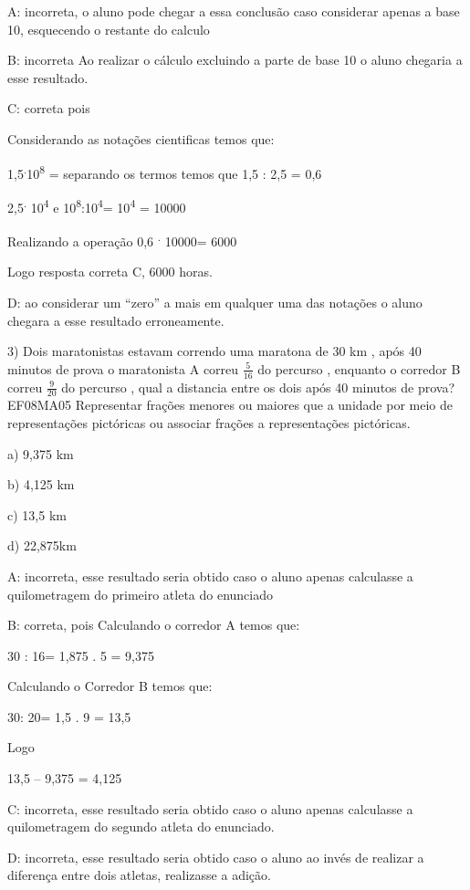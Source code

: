 {A: incorreta, o aluno pode chegar a essa conclusão caso considerar
apenas a base 10, esquecendo o restante do calculo

B: incorreta Ao realizar o cálculo excluindo a parte de base 10 o aluno
chegaria a esse resultado.

C: correta pois

Considerando as notações cientificas temos que:

1,5\textsuperscript{.}10\textsuperscript{8} = separando os termos temos
que 1,5 : 2,5 = 0,6

2,5\textsuperscript{.} 10\textsuperscript{4} e
10\textsuperscript{8}:10\textsuperscript{4}= 10\textsuperscript{4} =
10000

Realizando a operação 0,6 \textsuperscript{.} 10000= 6000

Logo resposta correta C, 6000 horas.

D: ao considerar um ``zero'' a mais em qualquer uma das notações o aluno
chegara a esse resultado erroneamente.

3) Dois maratonistas estavam correndo uma maratona de 30 km , após 40
minutos de prova o maratonista A correu \(\frac{5}{16}\) do percurso ,
enquanto o corredor B correu \(\frac{9}{20}\) do percurso , qual a
distancia entre os dois após 40 minutos de prova? EF08MA05 Representar
frações menores ou maiores que a unidade por meio de representações
pictóricas ou associar frações a representações pictóricas.

a) 9,375 km

b) 4,125 km

c) 13,5 km

d) 22,875km

A: incorreta, esse resultado seria obtido caso o aluno apenas calculasse
a quilometragem do primeiro atleta do enunciado

B: correta, pois Calculando o corredor A temos que:

30 : 16= 1,875 . 5 = 9,375

Calculando o Corredor B temos que:

30: 20= 1,5 . 9 = 13,5

Logo

13,5 -- 9,375 = 4,125

C: incorreta, esse resultado seria obtido caso o aluno apenas calculasse
a quilometragem do segundo atleta do enunciado.

D: incorreta, esse resultado seria obtido caso o aluno ao invés de
realizar a diferença entre dois atletas, realizasse a adição.

}

